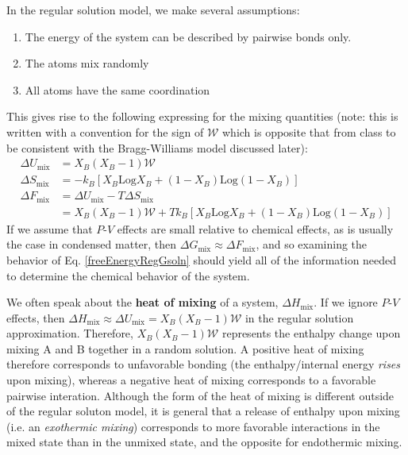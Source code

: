 \documentclass[12pt]{article}
\begin{document}
In the regular solution model, we make several assumptions:
\begin{enumerate}
\item The energy of the system can be described by pairwise bonds only.
\item The atoms mix randomly
\item All atoms have the same coordination
\end{enumerate}
This gives rise to the following expressing for the mixing quantities (note: this is written with a convention for the sign of $\mathcal{W}$ which is opposite that from class to be consistent with the Bragg-Williams model discussed later):
\begin{align}
\Delta U_{\text{mix}} &= X_B\left(X_B-1\right)\mathcal{W}  \\ 
\Delta S_{\text{mix}}&=-k_B\left[X_B\text{Log} X_B+\left(1-X_B\right)\text{Log} \left(1-X_B\right)\right] \\
\Delta F_{\text{mix}}&=\Delta U_{\text{mix}}-T\Delta S_{\text{mix}} \\
 &= X_B\left(X_B-1\right)\mathcal{W}+T k_B\left[X_B\text{Log} X_B+\left(1-X_B\right)\text{Log} \left(1-X_B\right)\right]  \label{freeEnergyRegGsoln}
\end{align}
If we assume that $P$-$V$ effects are small relative to chemical effects, as is usually the case in condensed matter, then \(\Delta G_{\text{mix}}\approx \Delta F_{\text{mix}}\), and so examining the behavior of Eq. \ref{freeEnergyRegGsoln} should yield all of the information
needed to determine the chemical behavior of the system.\par
We often speak about the \textbf{heat of mixing} of a system, \(\Delta H_{\text{mix}}\). If we ignore $P$-$V$ effects, then \(\Delta H_{\text{mix}} \approx \Delta U_{\text{mix}}=X_B\left(X_B-1\right)\mathcal{W}\) in the regular solution approximation. 
Therefore, \(X_B\left(X_B-1\right)\mathcal{W}\) represents the enthalpy change upon mixing A and B together in a random solution. A positive heat
of mixing therefore corresponds to unfavorable bonding (the enthalpy/internal energy \textit{rises} upon mixing), whereas a negative heat of mixing
corresponds to a favorable pairwise interation. Although the form of the heat of mixing is different outside of the regular soluton model, it is general that a release of enthalpy upon mixing (i.e. an \textit{exothermic mixing}) corresponds to more favorable interactions in the mixed state
than in the unmixed state, and the opposite for endothermic mixing.\par
\end{document}
